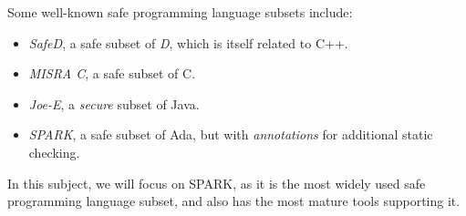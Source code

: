 Some well-known safe programming language subsets include:

\begin{itemize}

 \item {\em SafeD}, a  safe subset of {\em D}, which is itself related to C++.

 \item {\em MISRA C}, a safe subset of C.

 \item {\em Joe-E},  a {\em secure} subset of Java.

 \item {\em SPARK}, a safe subset of Ada, but with {\em annotations} for additional static checking.

\end{itemize}

In this subject, we will focus on SPARK, as it is the most widely used safe programming language subset, and also has the most mature tools supporting it.


